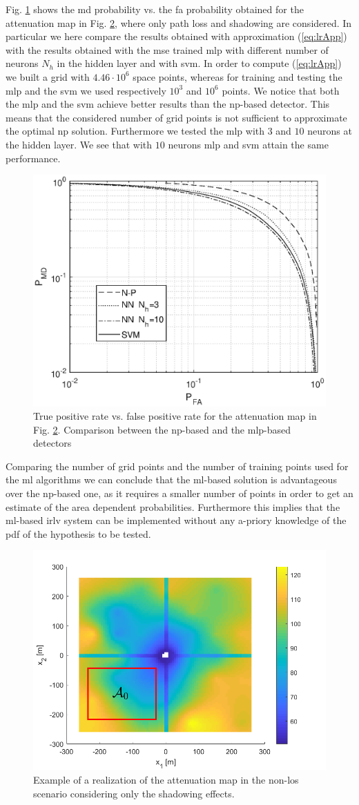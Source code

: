\documentclass[draftcls,onecolumn,12pt]{IEEEtran}
\begin{document}
Fig. \ref{fig:trueMap} shows the \ac{md} probability vs. the \ac{fa} probability obtained for the attenuation map in Fig. \ref{fig:map}, where only path loss and shadowing are considered. In particular we here compare the results obtained with approximation (\ref{eq:lrApp}) with the results obtained with the \ac{mse} trained \ac{mlp} with different number of neurons $N_h$ in the hidden layer and with \ac{svm}.
In order to compute (\ref{eq:lrApp}) we built a grid with $4.46 \cdot 10^6$ space points, whereas for training and testing the \ac{mlp} and the \ac{svm} we used respectively $10^3$ and $10^6$ points. We notice that both the \ac{mlp} and the \ac{svm} achieve better results than the \ac{np}-based detector. This means that the considered number of grid points is not sufficient to approximate the optimal \ac{np} solution. Furthermore we tested the \ac{mlp} with $3$ and $10$ neurons at the hidden layer. We see that with $10$ neurons \ac{mlp} and \ac{svm} attain the same performance. 

\begin{figure}[t]
    \centering
    \includegraphics[width=0.5\columnwidth]{res_NP_approx_SVM.eps}
    \caption{True positive rate vs. false positive rate for the attenuation map in Fig. \ref{fig:map}. Comparison between the \ac{np}-based and the \ac{mlp}-based detectors}
    \label{fig:trueMap}
\end{figure}

Comparing the number of grid points and the number of training points used for the \ac{ml} algorithms we can conclude that the \ac{ml}-based solution is advantageous over the \ac{np}-based one, as it requires a smaller number of points in order to get an estimate of the area dependent probabilities. Furthermore this implies that the \ac{ml}-based \ac{irlv} system can be implemented without any a-priory knowledge of the \ac{pdf} of the hypothesis to be tested.

\begin{figure}[t]
    \centering
    \includegraphics[width=0.5\columnwidth]{surfColorato.png}
    \caption{Example of a realization of the attenuation map in the non-\ac{los} scenario considering only the shadowing effects.}
    \label{fig:map}
\end{figure}
\end{document}
